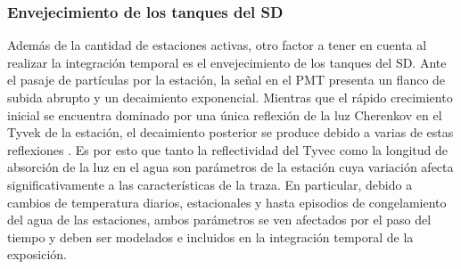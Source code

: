 	\subsubsection{Envejecimiento de los tanques del SD}
	
	Además de la cantidad de estaciones activas, otro factor a tener en cuenta al realizar la integración temporal es el envejecimiento de los tanques del SD.
% 	
	Ante el pasaje de partículas por la estación, la señal en el PMT presenta un flanco de subida abrupto y un decaimiento exponencial.
	Mientras que el rápido crecimiento inicial se encuentra dominado por una única reflexión de la luz Cherenkov en el Tyvek de la estación, el decaimiento posterior se produce debido a varias de estas reflexiones \cite{icrc11Sato}.
	Es por esto que tanto la reflectividad del Tyvec como la longitud de absorción de la luz en el agua son parámetros de la estación cuya variaci\'on afecta significativamente a las características de la traza.
	En particular, debido a cambios de temperatura diarios, estacionales y hasta episodios de congelamiento del agua de las estaciones, ambos parámetros se ven afectados por el paso del tiempo y deben ser modelados e incluidos en la integraci\'on temporal de la exposici\'on.
	
